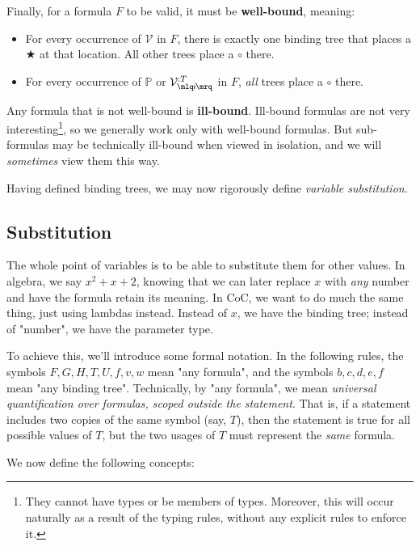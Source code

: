 \documentclass{article}
\newcommand{\Prop}{\mathbb{P}}
\newcommand{\usage}{\mathcal{V}}
\newcommand{\usageKnown}[2]{{\usage_{\mlq\hspace{-0.06em}#2\hspace{-0.06em}\mrq}^{:#1}}}
\newcommand{\bindvariable}{\bigstar}
\newcommand{\bindnotthis}{\circ}
\begin{document}
  Finally, for a formula $F$ to be valid, it must be \textbf{well-bound}, meaning:
  \begin{itemize}
    \item For every occurrence of $\usage$ in $F$, there is exactly one binding tree that places a $\bindvariable$ at that location. All other trees place a $\bindnotthis$ there.
    \item For every occurrence of $\Prop$ or $\usageKnown{T}{i}$ in $F$, \emph{all} trees place a $\bindnotthis$ there.
  \end{itemize}
  
  Any formula that is not well-bound is \textbf{ill-bound}. Ill-bound formulas are not very interesting\footnote{They cannot have types or be members of types. Moreover, this will occur naturally as a result of the typing rules, without any explicit rules to enforce it.}, so we generally work only with well-bound formulas. But sub-formulas may be technically ill-bound when viewed in isolation, and we will \emph{sometimes} view them this way.
  
  Having defined binding trees, we may now rigorously define \emph{variable substitution}.
  
  
  
  \subsection{Substitution}
  
  The whole point of variables is to be able to substitute them for other values. In algebra, we say $x^2 + x + 2$, knowing that we can later replace $x$ with \emph{any} number and have the formula retain its meaning. In CoC, we want to do much the same thing, just using lambdas instead. Instead of $x$, we have the binding tree; instead of "number", we have the parameter type.
  
  To achieve this, we'll introduce some formal notation. In the following rules, the symbols $F,G,H,T,U,f,v,w$ mean "any formula", and the symbols $b,c,d,e,f$ mean "any binding tree". Technically, by "any formula", we mean \emph{universal quantification over formulas, scoped outside the statement}. That is, if a statement includes two copies of the same symbol (say, $T$), then the statement is true for all possible values of $T$, but the two usages of $T$ must represent the \emph{same} formula.
  
  We now define the following concepts:
  
\end{document}
